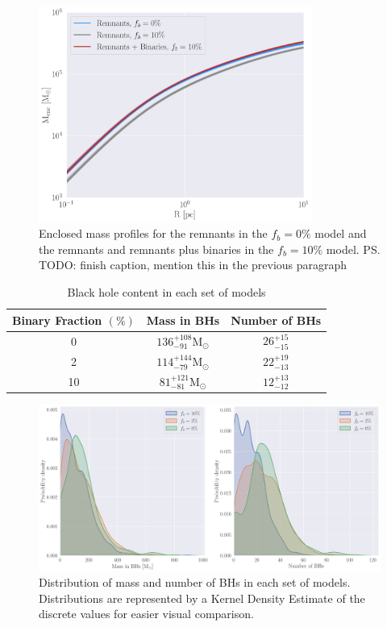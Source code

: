\begin{figure}
	\centering
	\includegraphics[width=0.8\textwidth]{figures/mass_enc_comp.png}
	\caption{Enclosed mass profiles for the remnants in the $f_b =0\%$ model and the remnants
		and remnants plus binaries in the $f_b =10\%$ model. \ps{TODO: finish caption,
		mention this in the previous paragraph }}
	\label{fig:mass_enc_comp}
\end{figure}


\begin{table}
	\centering
	\caption{Black hole content in each set of models}
	\begin{tabular}{c c c}
		\hline
		Binary Fraction $(\%)$ & Mass in BHs                         & Number of BHs    \\
		\hline
		0                      & $136^{+108}_{-91} \mathrm{M}_\odot$ & $26^{+15}_{-15}$ \\
		2                      & $114^{+144}_{-79} \mathrm{M}_\odot$ & $22^{+19}_{-13}$ \\
		10                     & $81 ^{+121}_{-81} \mathrm{M}_\odot$ & $12^{+13}_{-12}$ \\
		\hline
	\end{tabular}
	\label{tab:BH_contents}
\end{table}


\begin{figure}
	\centering
	\includegraphics[width=\textwidth]{figures/BH_KDEs.png}
	\caption{Distribution of mass and number of BHs in each set of models. Distributions are
		represented by a Kernel Density Estimate of the discrete values for easier visual
		comparison.}
	\label{fig:BH_KDEs}
\end{figure}


